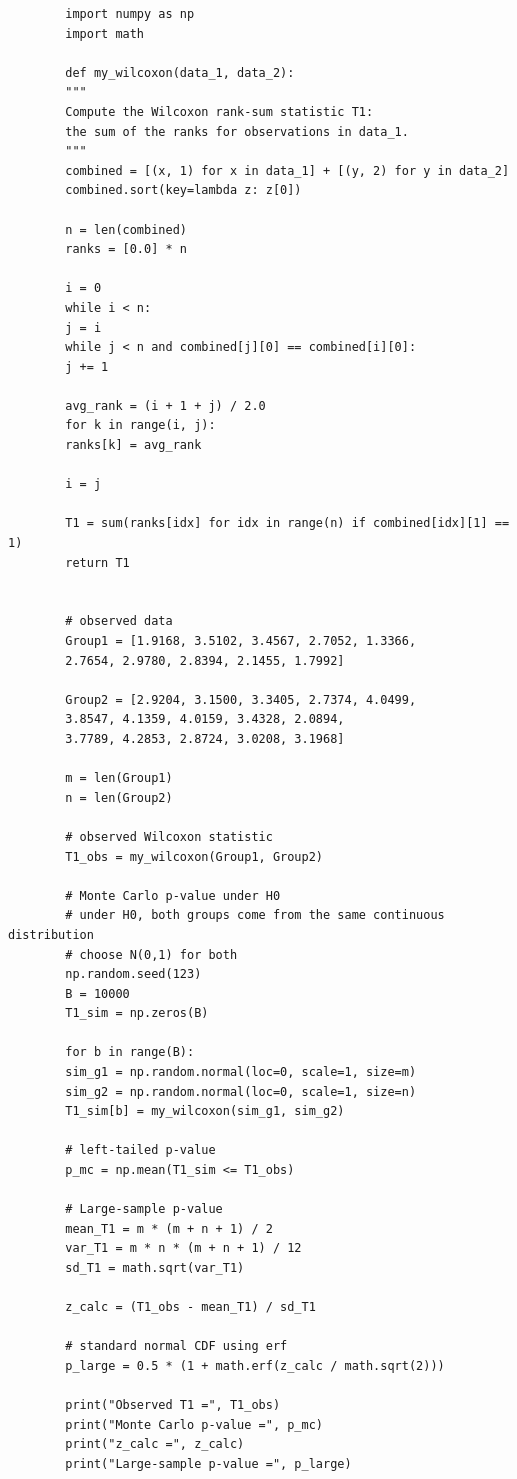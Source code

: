 \documentclass[letterpaper]{article}
\begin{document}
	\begin{lstlisting}
		import numpy as np
		import math
		
		def my_wilcoxon(data_1, data_2):
		"""
		Compute the Wilcoxon rank-sum statistic T1:
		the sum of the ranks for observations in data_1.
		"""
		combined = [(x, 1) for x in data_1] + [(y, 2) for y in data_2]
		combined.sort(key=lambda z: z[0])
		
		n = len(combined)
		ranks = [0.0] * n
		
		i = 0
		while i < n:
		j = i
		while j < n and combined[j][0] == combined[i][0]:
		j += 1
		
		avg_rank = (i + 1 + j) / 2.0
		for k in range(i, j):
		ranks[k] = avg_rank
		
		i = j
		
		T1 = sum(ranks[idx] for idx in range(n) if combined[idx][1] == 1)
		return T1
		
		
		# observed data
		Group1 = [1.9168, 3.5102, 3.4567, 2.7052, 1.3366,
		2.7654, 2.9780, 2.8394, 2.1455, 1.7992]
		
		Group2 = [2.9204, 3.1500, 3.3405, 2.7374, 4.0499,
		3.8547, 4.1359, 4.0159, 3.4328, 2.0894,
		3.7789, 4.2853, 2.8724, 3.0208, 3.1968]
		
		m = len(Group1)
		n = len(Group2)
		
		# observed Wilcoxon statistic
		T1_obs = my_wilcoxon(Group1, Group2)
		
		# Monte Carlo p-value under H0
		# under H0, both groups come from the same continuous distribution
		# choose N(0,1) for both
		np.random.seed(123)
		B = 10000
		T1_sim = np.zeros(B)
		
		for b in range(B):
		sim_g1 = np.random.normal(loc=0, scale=1, size=m)
		sim_g2 = np.random.normal(loc=0, scale=1, size=n)
		T1_sim[b] = my_wilcoxon(sim_g1, sim_g2)
		
		# left-tailed p-value
		p_mc = np.mean(T1_sim <= T1_obs)
		
		# Large-sample p-value
		mean_T1 = m * (m + n + 1) / 2
		var_T1 = m * n * (m + n + 1) / 12
		sd_T1 = math.sqrt(var_T1)
		
		z_calc = (T1_obs - mean_T1) / sd_T1
		
		# standard normal CDF using erf
		p_large = 0.5 * (1 + math.erf(z_calc / math.sqrt(2)))
		
		print("Observed T1 =", T1_obs)
		print("Monte Carlo p-value =", p_mc)
		print("z_calc =", z_calc)
		print("Large-sample p-value =", p_large)
	\end{lstlisting}
	
\end{document}
